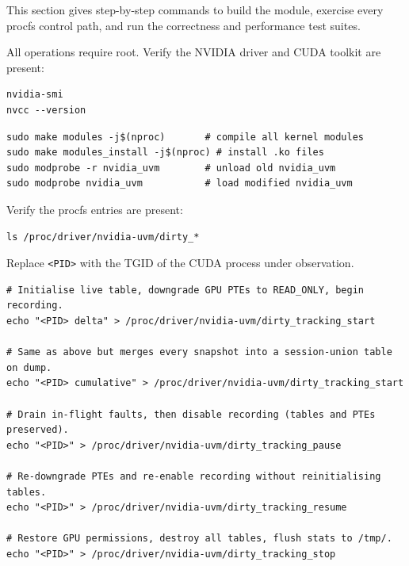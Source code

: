 
This section gives step-by-step commands to build the module, exercise every
procfs control path, and run the correctness and performance test suites.


All operations require root. Verify the NVIDIA driver and CUDA toolkit are present:

\begin{lstlisting}
nvidia-smi
nvcc --version
\end{lstlisting}


\begin{lstlisting}
sudo make modules -j$(nproc)       # compile all kernel modules
sudo make modules_install -j$(nproc) # install .ko files
sudo modprobe -r nvidia_uvm        # unload old nvidia_uvm
sudo modprobe nvidia_uvm           # load modified nvidia_uvm
\end{lstlisting}

Verify the procfs entries are present:

\begin{lstlisting}
ls /proc/driver/nvidia-uvm/dirty_*
\end{lstlisting}


Replace \texttt{<PID>} with the TGID of the CUDA process under observation.


\begin{lstlisting}
# Initialise live table, downgrade GPU PTEs to READ_ONLY, begin recording.
echo "<PID> delta" > /proc/driver/nvidia-uvm/dirty_tracking_start

# Same as above but merges every snapshot into a session-union table on dump.
echo "<PID> cumulative" > /proc/driver/nvidia-uvm/dirty_tracking_start

# Drain in-flight faults, then disable recording (tables and PTEs preserved).
echo "<PID>" > /proc/driver/nvidia-uvm/dirty_tracking_pause

# Re-downgrade PTEs and re-enable recording without reinitialising tables.
echo "<PID>" > /proc/driver/nvidia-uvm/dirty_tracking_resume

# Restore GPU permissions, destroy all tables, flush stats to /tmp/.
echo "<PID>" > /proc/driver/nvidia-uvm/dirty_tracking_stop
\end{lstlisting}

